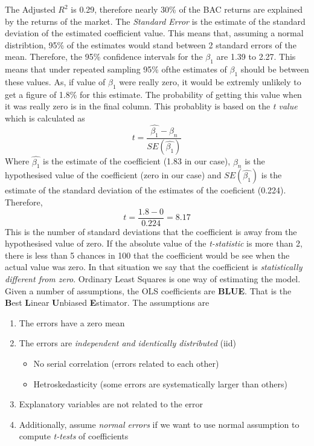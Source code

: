 \documentclass{article}\usepackage[]{graphicx}\usepackage[]{color}
\begin{document}
The Adjusted $R^2$ is 0.29, therefore nearly 30\% of the BAC returns are explained by the returns of the market.  The \emph{Standard Error} is the estimate of the standard deviation of the estimated coefficient value.  This means that, assuming a normal distribtion, 95\% of the estimates would stand between 2 standard errors of the mean.  Therefore, the 95\% confidence intervals for the $\beta_1$ are 1.39 to 2.27.  This means that under repeated sampling 95\% ofthe estimates of $\beta_1$ should be between these values.  As, if value of $\beta_1$ were really zero, it would be extremly unlikely to get a figure of 1.8\% for this estimate.  The probability of getting this value when it was really zero is in the final column.  This probablity is based on the \emph{t value} which is calculated as
\begin{equation}
t = \frac{\hat{\beta_1} - \beta_n}{SE(\hat{\beta_1})}
\end{equation}
Where $\hat{\beta_1}$ is the estimate of the coefficient (1.83 in our case), $\beta_n$ is the hypothesised value of the coefficient (zero in our case) and $SE(\hat{\beta_1})$ is the estimate of the standard deviation of the estimates of the coeficient (0.224).  Therefore, 
\begin{equation}
t = \frac{1.8 - 0}{0.224} = 8.17
\end{equation}
This is the number of standard deviations that the coefficient is away from the hypothesised value of zero.  If the absolute value of the \emph{t-statistic} is more than 2, there is less than 5 chances in 100 that the coefficient would be see when the actual value was zero.  In that situation we say that the coefficient is \emph{statistically different from zero}. 
Ordinary Least Squares is one way of estimating the model.  Given a number of assumptions, the OLS coefficients are \textbf{BLUE}.  That is the \textbf{B}est \textbf{L}inear \textbf{U}nbiased \textbf{E}stimator.  The assumptions are 
\begin{enumerate}
\item The errors have a zero mean
\item The errors are \emph{independent and identically distributed} (iid)
\begin{itemize}
\item No serial correlation (errors related to each other)
\item Hetroskedasticity (some errors are systematically larger than others)
\end{itemize}
\item Explanatory variables are not related to the error
\item Additionally, assume \emph{normal errors} if we want to use normal assumption to compute \emph{t-tests} of coefficients
\end{enumerate}
\end{document}

